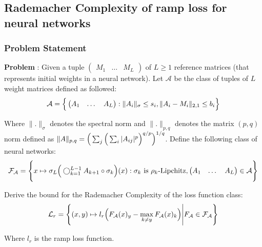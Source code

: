 \newpage
\subsection{Rademacher Complexity of ramp loss for neural networks}
\subsubsection{Problem Statement}
\textbf{Problem} : Given a tuple $\begin{pmatrix}M_1 & \dots & M_L\end{pmatrix}$ of $L\ge 1$ reference matrices (that represents initial weights in a neural network). Let $\mathcal{A}$ be the class of tuples of $L$ weight matrices defined as followed:
\begin{align*}
    \mathcal{A} = \Big\{ 
        \begin{pmatrix}
            A_1 & \dots & A_L
        \end{pmatrix} : \|A_i\|_\sigma \le s_i, \|A_i - M_i\|_{2, 1}\le b_i
     \Big\}
\end{align*}

\noindent Where $\|.\|_\sigma$ denotes the spectral norm and $\|.\|_{p, q}$ denotes the matrix $(p, q)$ norm defined as $\|A\|_{p, q} = \Big( \sum_j\Big( \sum_{i}|A_{ij}|^p \Big)^{q/p} \Big)^{1/q}$. Define the following class of neural networks:
\begin{align*}
    \mathcal{F}_\mathcal{A} = \Bigg\{ 
        x\mapsto \sigma_L \Big( 
            \bigcirc_{k=1}^{L-1} A_{k+1} \circ \sigma_k
         \Big)(x) : \sigma_k \text{ is } \rho_k\text{-Lipchitz}, \begin{pmatrix}
            A_1 & \dots & A_L
        \end{pmatrix} \in \mathcal{A}
     \Bigg\}
\end{align*}

\noindent Derive the bound for the Rademacher Complexity of the loss function class:
\begin{align*}
    \mathcal{L}_r = \Bigg\{ 
        (x, y) \mapsto l_r\Big( 
            F_\mathcal{A}(x)_y - \max_{k\ne y}F_\mathcal{A}(x)_k
         \Big) \Bigg| F_\mathcal{A} \in \mathcal{F}_\mathcal{A}
     \Bigg\}
\end{align*}

\noindent Where $l_r$ is the ramp loss function.
